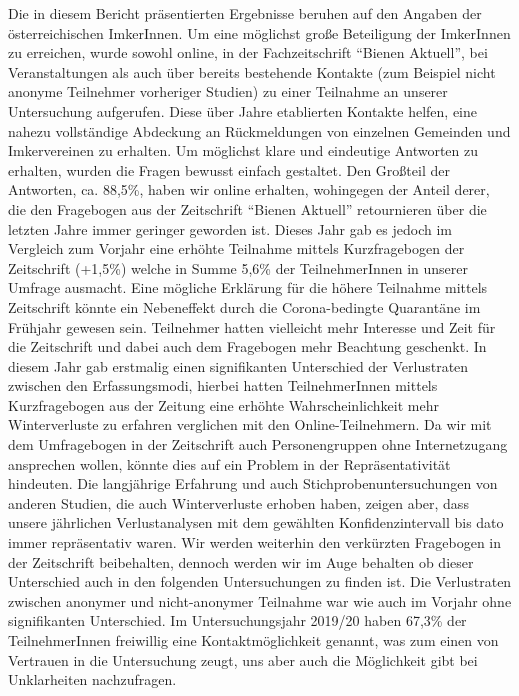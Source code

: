 Die in diesem Bericht präsentierten Ergebnisse beruhen auf den Angaben der österreichischen ImkerInnen. Um eine möglichst große Beteiligung der ImkerInnen zu erreichen, wurde sowohl online, in der Fachzeitschrift \enquote{Bienen Aktuell}, bei Veranstaltungen als auch über bereits bestehende Kontakte (zum Beispiel nicht anonyme Teilnehmer vorheriger Studien) zu einer Teilnahme an unserer Untersuchung aufgerufen. Diese über Jahre etablierten Kontakte helfen, eine nahezu vollständige Abdeckung an Rückmeldungen von einzelnen Gemeinden und Imkervereinen zu erhalten. Um möglichst klare und eindeutige Antworten zu erhalten, wurden die Fragen bewusst einfach gestaltet. Den Großteil der Antworten, ca. 88,5\%, haben wir online erhalten, wohingegen der Anteil derer, die den Fragebogen aus der Zeitschrift \enquote{Bienen Aktuell} retournieren über die letzten Jahre immer geringer geworden ist. Dieses Jahr gab es jedoch im Vergleich zum Vorjahr eine erhöhte Teilnahme mittels Kurzfragebogen der Zeitschrift (+1,5\%) welche in Summe 5,6\% der TeilnehmerInnen in unserer Umfrage ausmacht. Eine mögliche Erklärung für die höhere Teilnahme mittels Zeitschrift könnte ein Nebeneffekt durch die Corona-bedingte Quarantäne im Frühjahr gewesen sein. Teilnehmer hatten vielleicht mehr Interesse und Zeit für die Zeitschrift und dabei auch dem Fragebogen mehr Beachtung geschenkt.
\newline
In diesem Jahr gab erstmalig einen signifikanten Unterschied der Verlustraten zwischen den Erfassungsmodi, hierbei hatten TeilnehmerInnen mittels Kurzfragebogen aus der Zeitung eine erhöhte Wahrscheinlichkeit mehr Winterverluste zu erfahren verglichen mit den Online-Teilnehmern. Da wir mit dem Umfragebogen in der Zeitschrift auch Personengruppen ohne Internetzugang ansprechen wollen, könnte dies auf ein Problem in der Repräsentativität hindeuten. Die langjährige Erfahrung und auch Stichprobenuntersuchungen von anderen Studien, die auch Winterverluste erhoben haben, zeigen aber, dass unsere jährlichen Verlustanalysen mit dem gewählten Konfidenzintervall bis dato immer repräsentativ waren. Wir werden weiterhin den verkürzten Fragebogen in der Zeitschrift beibehalten, dennoch werden wir im Auge behalten ob dieser Unterschied auch in den folgenden Untersuchungen zu finden ist. 
\newline
Die Verlustraten zwischen anonymer und nicht-anonymer Teilnahme war wie auch im Vorjahr ohne signifikanten Unterschied. Im Untersuchungsjahr 2019/20 haben 67,3\% der TeilnehmerInnen freiwillig eine Kontaktmöglichkeit genannt, was zum einen von Vertrauen in die Untersuchung zeugt, uns aber auch die Möglichkeit gibt bei Unklarheiten nachzufragen.
